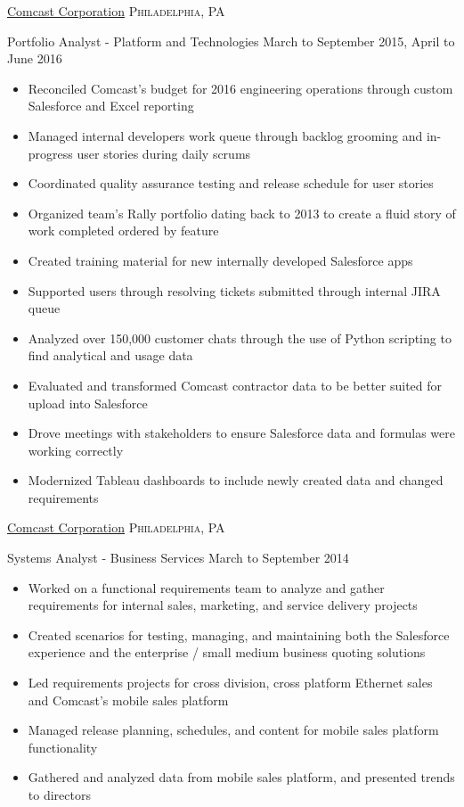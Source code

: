 \documentclass[10pt,letterpaper]{article}
\begin{document}
\headedsection
  {\href{http://corporate.comcast.com/}{Comcast Corporation}}
  {\textsc{Philadelphia, PA}} {%
  \headedsubsection
    {Portfolio Analyst - Platform and Technologies}
    {March to September 2015, April to June 2016}
    {\begin{itemize}
    \item Reconciled Comcast's budget for 2016 engineering operations through custom Salesforce and Excel reporting
    \item Managed internal developers work queue through backlog grooming and in-progress user stories during daily scrums
    \item Coordinated quality assurance testing and release schedule for user stories
    \item Organized team's Rally portfolio dating back to 2013 to create a fluid story of work completed ordered by feature
    \item Created training material for new internally developed Salesforce apps
    \item Supported users through resolving tickets submitted through internal JIRA queue
    \item Analyzed over 150,000 customer chats through the use of Python scripting to find analytical and usage data
    \item Evaluated and transformed Comcast contractor data to be better suited for upload into Salesforce
    \item Drove meetings with stakeholders to ensure Salesforce data and formulas were working correctly
    \item Modernized Tableau dashboards to include newly created data and changed requirements
    \end{itemize}}
}

\headedsection
  {\href{http://corporate.comcast.com/}{Comcast Corporation}}
  {\textsc{Philadelphia, PA}} {%
  \headedsubsection
    {Systems Analyst - Business Services}
    {March to September 2014}
    {\begin{itemize}
    \item Worked on a functional requirements team to analyze and gather requirements for internal sales, marketing, and service delivery projects
    \item Created scenarios for testing, managing, and maintaining both the Salesforce experience and the enterprise / small medium business quoting solutions
    \item Led requirements projects for cross division, cross platform Ethernet sales and Comcast's mobile sales platform
    \item Managed release planning, schedules, and content for mobile sales platform functionality
    \item Gathered and analyzed data from mobile sales platform, and presented trends to directors
    \end{itemize}}
}
\end{document}

